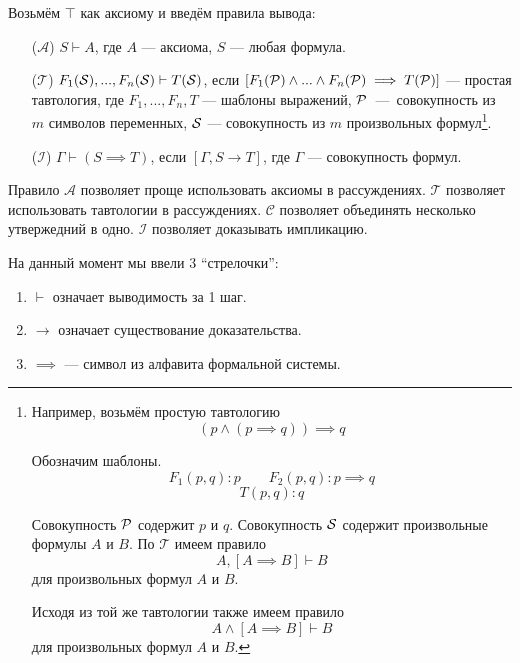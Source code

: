 Возьмём $\top$ как аксиому и введём правила вывода:

\newcommand\taut{$\mathcal T$}
\newcommand\axiom{$\mathcal A$}
\newcommand\conj{$\mathcal C$}
\newcommand\implic{$\mathcal I$}
\begin{enumerate}
	\item[(\axiom)]{}$S\vdash A$, где $A$ --- аксиома, $S$ --- любая формула.

	\item[(\taut)]{}$F_1(\mathcal S),...,F_n(\mathcal S)\vdash T(\mathcal S)$,
	если ${[F_1(\mathcal P)\land...\land F_n(\mathcal P)\implies T(\mathcal P)]}$ --- простая тавтология,
	где $F_{1},...,F_{n},T$ --- шаблоны выражений,
	$\mathcal P$~---~совокупность из $m$ символов переменных,
	$\mathcal S$ --- совокупность из $m$ произвольных формул\footnote{
		Например, возьмём простую тавтологию
		\[
			(p\land (p\implies q))\implies q
		\]

		Обозначим шаблоны.
		\[
			F_1(p,q): p\qquad
			F_2(p,q): p\implies q
		\]
		\[
			T(p,q): q
		\]

		Совокупность $\mathcal P$ содержит $p$ и $q$.
		Совокупность $\mathcal S$ содержит произвольные формулы $A$ и $B$.
		По \taut{} имеем правило
		\[
			A,[A\implies B]\vdash B
		\]
		для произвольных формул $A$ и $B$.

		Исходя из той же тавтологии также имеем правило
		\[
			A\land[A\implies B]\vdash B
		\]
		для произвольных формул $A$ и $B$.
	}.

	\item[(\implic)]{}${\Gamma\vdash (S\implies T)}$, если $[\Gamma,S\to T]$, где $\Gamma$
	--- совокупность формул.
\end{enumerate}

Правило \axiom{} позволяет проще использовать аксиомы в рассуждениях.
\taut{} позволяет использовать тавтологии в рассуждениях.
\conj{} позволяет объединять несколько утвержедний в одно.
\implic{} позволяет доказывать импликацию.

На данный момент мы ввели 3 ``стрелочки'':
\begin{enumerate}
	\item{}$\vdash$ означает выводимость за 1 шаг.
	\item{}$\to$ означает существование доказательства.
	\item{}$\implies$ --- символ из алфавита формальной системы.
\end{enumerate}


